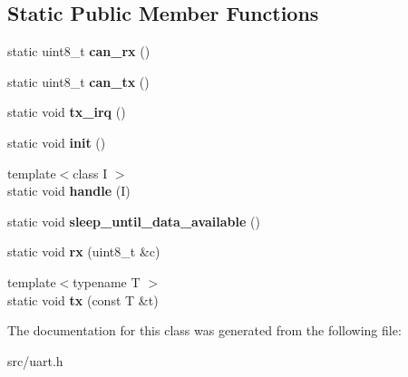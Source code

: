 \subsection*{Static Public Member Functions}
\begin{DoxyCompactItemize}
\item 
static uint8\+\_\+t {\bfseries can\+\_\+rx} ()\hypertarget{classUart_a6c161d1f3756de42bd7e71db62499c55}{}\label{classUart_a6c161d1f3756de42bd7e71db62499c55}

\item 
static uint8\+\_\+t {\bfseries can\+\_\+tx} ()\hypertarget{classUart_a44aa3c55760475395e3a45af6498b9b4}{}\label{classUart_a44aa3c55760475395e3a45af6498b9b4}

\item 
static void {\bfseries tx\+\_\+irq} ()\hypertarget{classUart_ab95b2a2c36012e3e34d200e720f14402}{}\label{classUart_ab95b2a2c36012e3e34d200e720f14402}

\item 
static void {\bfseries init} ()\hypertarget{classUart_a402fb771b97c6086339ef5ed1e796dbb}{}\label{classUart_a402fb771b97c6086339ef5ed1e796dbb}

\item 
{\footnotesize template$<$class I $>$ }\\static void {\bfseries handle} (I)\hypertarget{classUart_a978f2e11bdccc2cc64efe9efbb3c4111}{}\label{classUart_a978f2e11bdccc2cc64efe9efbb3c4111}

\item 
static void {\bfseries sleep\+\_\+until\+\_\+data\+\_\+available} ()\hypertarget{classUart_abf6d7c3471e104a4a211ca57425096c3}{}\label{classUart_abf6d7c3471e104a4a211ca57425096c3}

\item 
static void {\bfseries rx} (uint8\+\_\+t \&c)\hypertarget{classUart_af5ac57cdb25773aebfe644b080e0da3a}{}\label{classUart_af5ac57cdb25773aebfe644b080e0da3a}

\item 
{\footnotesize template$<$typename T $>$ }\\static void {\bfseries tx} (const T \&t)\hypertarget{classUart_af1b3b331220c1c2871ea3f7844736e85}{}\label{classUart_af1b3b331220c1c2871ea3f7844736e85}

\end{DoxyCompactItemize}


The documentation for this class was generated from the following file\+:\begin{DoxyCompactItemize}
\item 
src/uart.\+h\end{DoxyCompactItemize}
